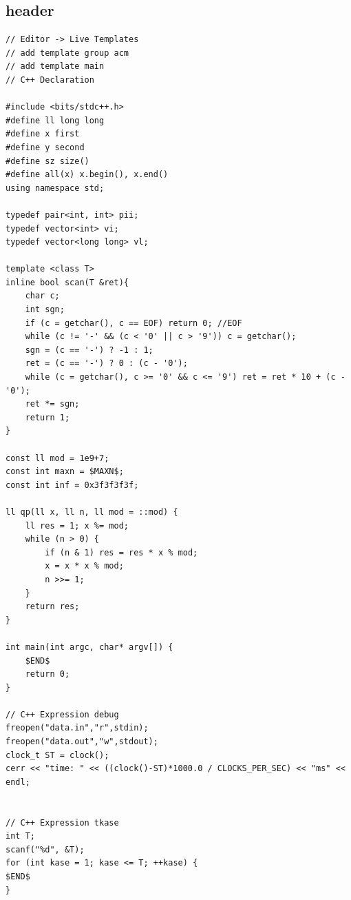 \documentclass[twoside]{article}
\begin{document}
\subsection{header}
\begin{lstlisting}
// Editor -> Live Templates
// add template group acm
// add template main
// C++ Declaration

#include <bits/stdc++.h>
#define ll long long
#define x first
#define y second
#define sz size()
#define all(x) x.begin(), x.end()
using namespace std;

typedef pair<int, int> pii;
typedef vector<int> vi;
typedef vector<long long> vl;

template <class T>
inline bool scan(T &ret){
    char c;
    int sgn;
    if (c = getchar(), c == EOF) return 0; //EOF
    while (c != '-' && (c < '0' || c > '9')) c = getchar();
    sgn = (c == '-') ? -1 : 1;
    ret = (c == '-') ? 0 : (c - '0');
    while (c = getchar(), c >= '0' && c <= '9') ret = ret * 10 + (c - '0');
    ret *= sgn;
    return 1;
}

const ll mod = 1e9+7;
const int maxn = $MAXN$;
const int inf = 0x3f3f3f3f;

ll qp(ll x, ll n, ll mod = ::mod) {
    ll res = 1; x %= mod;
    while (n > 0) {
        if (n & 1) res = res * x % mod;
        x = x * x % mod;
        n >>= 1;
    }
    return res;
}

int main(int argc, char* argv[]) {
    $END$
    return 0;
}

// C++ Expression debug
freopen("data.in","r",stdin);
freopen("data.out","w",stdout);
clock_t ST = clock();
cerr << "time: " << ((clock()-ST)*1000.0 / CLOCKS_PER_SEC) << "ms" << endl;


// C++ Expression tkase
int T;
scanf("%d", &T);
for (int kase = 1; kase <= T; ++kase) { 
$END$
}\end{lstlisting}
\end{document}
